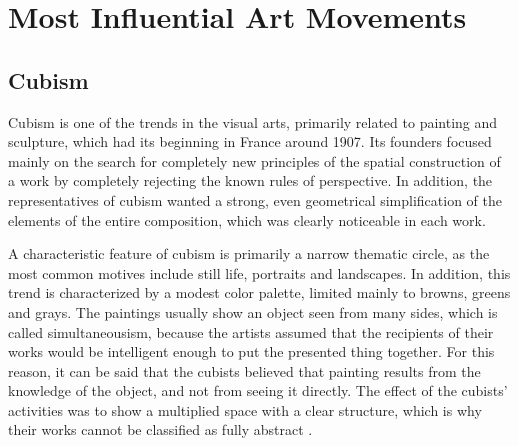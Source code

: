 \documentclass{report}
\begin{document}
\chapter{Most Influential Art Movements}
\label{chap.influential_art_movements}

\section{Cubism}

Cubism is one of the trends in the visual arts, primarily related to painting and sculpture, which had its beginning in France around 1907. Its founders focused mainly on the search for completely new principles of the spatial construction of a work by completely rejecting the known rules of perspective. In addition, the representatives of cubism wanted a strong, even geometrical simplification of the elements of the entire composition, which was clearly noticeable in each work. 

A characteristic feature of cubism is primarily a narrow thematic circle, as the most common motives include still life, portraits and landscapes. In addition, this trend is characterized by a modest color palette, limited mainly to browns, greens and grays. The paintings usually show an object seen from many sides, which is called simultaneousism, because the artists assumed that the recipients of their works would be intelligent enough to put the presented thing together. For this reason, it can be said that the cubists believed that painting results from the knowledge of the object, and not from seeing it directly. The effect of the cubists' activities was to show a multiplied space with a clear structure, which is why their works cannot be classified as fully abstract \cite{BOOK:2}.\medskip
\end{document}
